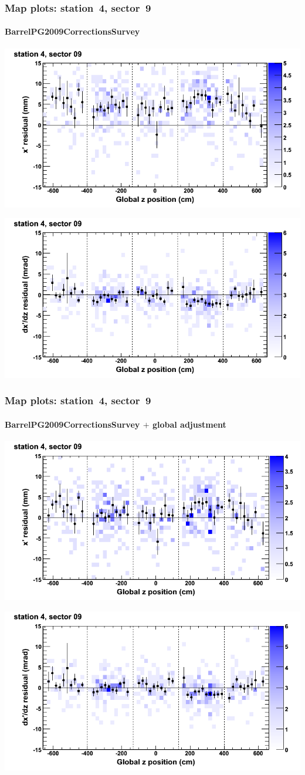 \documentclass[compress]{beamer}
\begin{document}
\begin{frame}
\frametitle{Map plots: station~4, sector~9}
\framesubtitle{BarrelPG2009CorrectionsSurvey}
\includegraphics[width=0.5\linewidth]{mapplots_01/DTvsz_st4sec09_x.png}

\includegraphics[width=0.5\linewidth]{mapplots_01/DTvsz_st4sec09_dxdz.png}
\end{frame}
\begin{frame}
\frametitle{Map plots: station~4, sector~9}
\framesubtitle{BarrelPG2009CorrectionsSurvey $+$ global adjustment}
\includegraphics[width=0.5\linewidth]{mapplots_re01/DTvsz_st4sec09_x.png}

\includegraphics[width=0.5\linewidth]{mapplots_re01/DTvsz_st4sec09_dxdz.png}
\end{frame}
\end{document}
